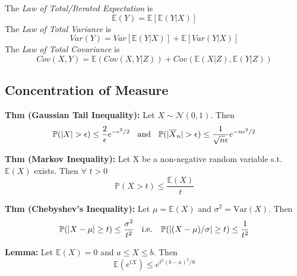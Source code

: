 \documentclass[10pt,twocolumn]{article}
\begin{document}
    The \emph{Law of Total/Iterated Expectation} is
    \begin{equation}
    \mathbb{E}(Y) = \mathbb{E}[\mathbb{E}(Y|X)]
    \end{equation}
    The \emph{Law of Total Variance} is
    \begin{equation}
    Var(Y) = Var[\mathbb{E}(Y|X)] + \mathbb{E}[Var(Y|X)]
    \end{equation}
    The \emph{Law of Total Covariance} is
    \begin{equation}
    Cov(X,Y) = \mathbb{E}(Cov(X,Y|Z)) + Cov(\mathbb{E}(X|Z), \mathbb{E}(Y|Z))
    \end{equation}


\subsection*{Concentration of Measure}
    \textbf{Thm (Gaussian Tail Inequality):}
    Let $X \sim \mathcal{N}(0,1)$. Then
    \begin{equation}
        \mathbb{P}(|X| > \epsilon) \leq \frac{2}{\epsilon}e^{-\epsilon^{2}/2} \hspace{2mm}\text{ and } \hspace{2mm}
        \mathbb{P}(|\overline{X}_{n}| > \epsilon) \leq \frac{1}{\sqrt{n}\epsilon}e^{-n\epsilon^{2}/2}
    \end{equation}
        
    \textbf{Thm (Markov Inequality):}
    Let X be a non-negative random variable s.t. $\mathbb{E}(X)$ exists. Then $\forall$ $t>0$
    \begin{equation}
        \mathbb{P}(X>t) \leq \frac{\mathbb{E}(X)}{t}
    \end{equation}

    \textbf{Thm (Chebyshev's Inequality):}
    Let $\mu = \mathbb{E}(X)$ and $\sigma^{2} = \text{Var}(X)$. Then
    \begin{equation}
        \mathbb{P}(|X-\mu| \geq t) \leq \frac{\sigma^{2}}{t^{2}} \hspace{2mm} \text{ i.e. } \hspace{2mm}
        \mathbb{P}(|(X-\mu)/\sigma| \geq t) \leq \frac{1}{t^{2}}
    \end{equation}

    \textbf{Lemma:}
    Let $\mathbb{E}(X) = 0$ and $a \leq X \leq b$. Then
    \begin{equation}
        \mathbb{E}(e^{tX}) \leq e^{t^{2}(b-a)^{2}/8}
    \end{equation}
\end{document}
